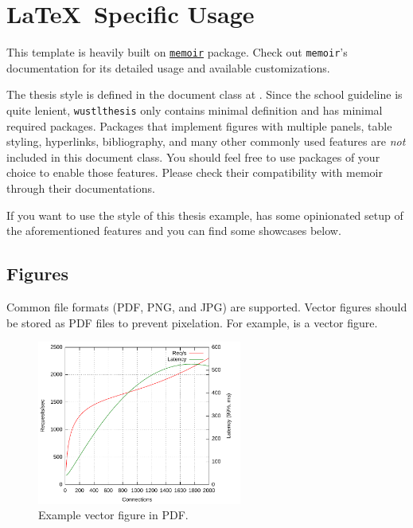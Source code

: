 \chapter{{\LaTeX}\ Specific Usage}

This template is heavily built on \href{https://www.ctan.org/pkg/memoir}{\texttt{memoir}} package.
Check out \texttt{memoir}'s documentation for its detailed usage and available customizations.

The thesis style is defined in the document class at .
Since the school guideline is quite lenient, \texttt{wustlthesis} only contains minimal definition and has minimal required packages.
Packages that implement figures with multiple panels, table styling, hyperlinks, bibliography, and many other commonly used features are \emph{not} included in this document class.
You should feel free to use packages of your choice to enable those features.
Please check their compatibility with memoir through their documentations.

If you want to use the style of this thesis example,  has some opinionated setup of the aforementioned features and you can find some showcases below.


\section{Figures}
Common file formats (PDF, PNG, and JPG) are supported.
Vector figures should be stored as PDF files to prevent pixelation.
For example,  is a vector figure.

\begin{figure}[tb]
  \centering
  \includegraphics[width=0.6\textwidth]{figures/just-a-plot}
  \caption{Example vector figure in PDF.}
  \label{fig:vector}
\end{figure}



